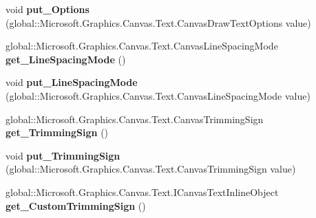 \begin{DoxyCompactItemize}
\mbox{\label{class_microsoft_1_1_graphics_1_1_canvas_1_1_text_1_1_canvas_text_layout_ad2eb965b4419db8c2fc551212750ef9e}} 
void {\bfseries put\+\_\+\+Options} (global\+::\+Microsoft.\+Graphics.\+Canvas.\+Text.\+Canvas\+Draw\+Text\+Options value)
\item 
\mbox{\label{class_microsoft_1_1_graphics_1_1_canvas_1_1_text_1_1_canvas_text_layout_a80e906d0512252d17b70c935fcc440a5}} 
global\+::\+Microsoft.\+Graphics.\+Canvas.\+Text.\+Canvas\+Line\+Spacing\+Mode {\bfseries get\+\_\+\+Line\+Spacing\+Mode} ()
\item 
\mbox{\label{class_microsoft_1_1_graphics_1_1_canvas_1_1_text_1_1_canvas_text_layout_a99b5936e69b1769d738e3d0437fa745d}} 
void {\bfseries put\+\_\+\+Line\+Spacing\+Mode} (global\+::\+Microsoft.\+Graphics.\+Canvas.\+Text.\+Canvas\+Line\+Spacing\+Mode value)
\item 
\mbox{\label{class_microsoft_1_1_graphics_1_1_canvas_1_1_text_1_1_canvas_text_layout_a5c236351aff1b822b001c6d58d99a4ef}} 
global\+::\+Microsoft.\+Graphics.\+Canvas.\+Text.\+Canvas\+Trimming\+Sign {\bfseries get\+\_\+\+Trimming\+Sign} ()
\item 
\mbox{\label{class_microsoft_1_1_graphics_1_1_canvas_1_1_text_1_1_canvas_text_layout_a6038b04e1633c19a344323c3adb9048c}} 
void {\bfseries put\+\_\+\+Trimming\+Sign} (global\+::\+Microsoft.\+Graphics.\+Canvas.\+Text.\+Canvas\+Trimming\+Sign value)
\item 
\mbox{\label{class_microsoft_1_1_graphics_1_1_canvas_1_1_text_1_1_canvas_text_layout_a5dc8d39fbd74051d1f66f159c55ef5f3}} 
global\+::\+Microsoft.\+Graphics.\+Canvas.\+Text.\+I\+Canvas\+Text\+Inline\+Object {\bfseries get\+\_\+\+Custom\+Trimming\+Sign} ()
\item 
\mbox{\label{class_microsoft_1_1_graphics_1_1_canvas_1_1_text_1_1_canvas_text_layout_a31d76ac5905938caf13ffb5911f8303a}} 

\end{DoxyCompactItemize}
